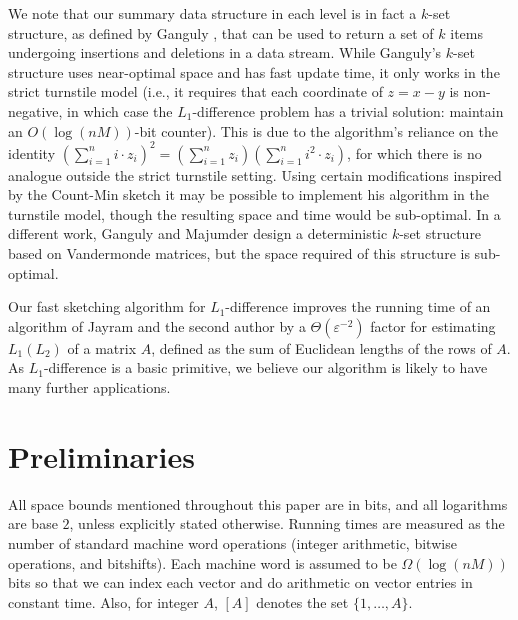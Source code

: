 \documentclass[letterpaper,11pt]{article}
\newcommand{\eps}{\varepsilon}
\newcommand{\SectionName}[1]{\label{sec:#1}}
\begin{document}
We note that our summary data structure in each level is in fact a
$k$-set structure, as defined by Ganguly \cite{Ganguly07}, that can be
used
to return a set of $k$ items undergoing insertions and deletions in a
data stream. While Ganguly's $k$-set structure uses near-optimal space
and has fast update time, it only works in the strict turnstile model
(i.e., it requires that each coordinate of $z = x-y$ is non-negative,
in which case the $L_1$-difference problem has a trivial solution:
maintain an $O(\log(nM))$-bit counter). This is due to the algorithm's
reliance on the identity $(\sum_{i=1}^n i\cdot z_i)^2 = (\sum_{i=1}^n
z_i)(\sum_{i=1}^n i^2\cdot z_i)$, for which there is no analogue
outside the strict turnstile setting. Using certain modifications
inspired by the Count-Min sketch \cite{cm05} it may be possible
to implement his algorithm in the turnstile model, though the resulting
space and time would be sub-optimal. In a different work, Ganguly
and Majumder
\cite{GM06} design a deterministic $k$-set structure based on
Vandermonde matrices, but the space required of this structure is
sub-optimal.

Our fast sketching algorithm for $L_1$-difference improves the running
time of an algorithm of Jayram and the second author \cite{jw08} 
by a $\Theta(\eps^{-2})$ factor for
estimating $L_1(L_2)$ of a matrix $A$, defined as the
sum of Euclidean lengths of the rows of $A$. As $L_1$-difference is a basic
primitive, we believe our algorithm is likely to have many further
applications.

\section{Preliminaries}\SectionName{prelim}
All space bounds mentioned throughout this paper are in bits, and all
logarithms are base $2$,  unless
explicitly stated otherwise. Running times are measured as the number
of standard machine word operations (integer arithmetic, bitwise
operations, and bitshifts). Each machine word is assumed to be
$\Omega(\log(nM))$ bits so that we can index each vector and do
arithmetic on vector entries in constant time. Also, for integer $A$,
$[A]$ denotes the set $\{1,\ldots, A\}$.
\end{document}
